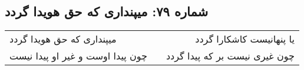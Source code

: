 \begin{center}
\section*{شماره ۷۹: میپنداری که حق هویدا گردد}
\label{sec:079}
\begin{longtable}{l p{0.5cm} r}
میپنداری که حق هویدا گردد
&&
یا پنهانیست کاشکارا گردد
\\
چون پیدا اوست و غیر او پیدا نیست
&&
چون غیری نیست بر که پیدا گردد
\\
\end{longtable}
\end{center}

